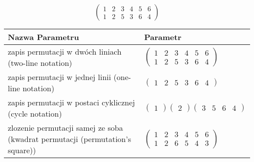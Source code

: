 \documentclass[12pt]{article}
\begin{document}
\subsection{}
\begin{center}
\[
\begin{pmatrix}
	1 & 2 & 3 & 4 & 5 & 6 \\ 
	1 & 2 & 5 & 3 & 6 & 4 
\end{pmatrix}
\]

\begin{tabular}{|m{0.6\linewidth}|m{0.4\linewidth}|}
	\hline
	Nazwa Parametru & Parametr \\
	\hline
	zapis permutacji w dwóch liniach (two-line notation) & $\begin{pmatrix} 1 & 2 & 3 & 4 & 5 & 6 \\ 
1 & 2 & 5 & 3 & 6 & 4 \end{pmatrix}$ \\ 
	\hline
	zapis permutacji w jednej linii (one-line notation) & $\begin{pmatrix} 1 & 2 & 5 & 3 & 6 & 4 \end{pmatrix}$ \\ 
	\hline
	zapis permutacji w postaci cyklicznej (cycle notation) & $\begin{pmatrix} 1 \end{pmatrix} \begin{pmatrix} 2 \end{pmatrix} \begin{pmatrix} 3 & 5 & 6 & 4 \end{pmatrix} $ \\ 
	\hline
	zlozenie permutacji samej ze soba (kwadrat permutacji (permutation's square)) & $\begin{pmatrix} 1 & 2 & 3 & 4 & 5 & 6 \\ 
1 & 2 & 6 & 5 & 4 & 3 \end{pmatrix}$ \\ 
	\hline
\end{tabular}
\end{center}
\end{document}
